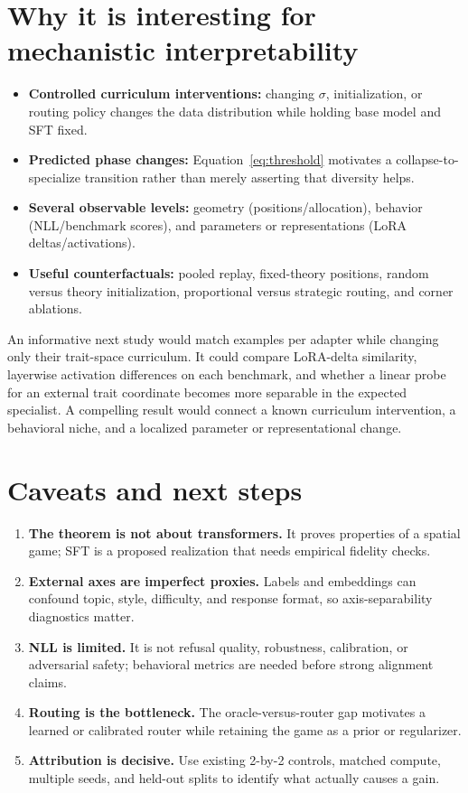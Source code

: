\documentclass[11pt]{article}
\begin{document}
\section{Why it is interesting for mechanistic interpretability}
\begin{itemize}
\item \textbf{Controlled curriculum interventions:} changing $\sigma$, initialization,
or routing policy changes the data distribution while holding base model and SFT fixed.
\item \textbf{Predicted phase changes:} Equation~\ref{eq:threshold} motivates a
collapse-to-specialize transition rather than merely asserting that diversity helps.
\item \textbf{Several observable levels:} geometry (positions/allocation), behavior
(NLL/benchmark scores), and parameters or representations (LoRA deltas/activations).
\item \textbf{Useful counterfactuals:} pooled replay, fixed-theory positions, random
versus theory initialization, proportional versus strategic routing, and corner ablations.
\end{itemize}
An informative next study would match examples per adapter while changing only their
trait-space curriculum. It could compare LoRA-delta similarity, layerwise activation
differences on each benchmark, and whether a linear probe for an external trait
coordinate becomes more separable in the expected specialist. A compelling result would
connect a known curriculum intervention, a behavioral niche, and a localized parameter
or representational change.

\section{Caveats and next steps}
\begin{enumerate}
\item \textbf{The theorem is not about transformers.} It proves properties of a spatial
game; SFT is a proposed realization that needs empirical fidelity checks.
\item \textbf{External axes are imperfect proxies.} Labels and embeddings can confound
topic, style, difficulty, and response format, so axis-separability diagnostics matter.
\item \textbf{NLL is limited.} It is not refusal quality, robustness, calibration, or
adversarial safety; behavioral metrics are needed before strong alignment claims.
\item \textbf{Routing is the bottleneck.} The oracle-versus-router gap motivates a
learned or calibrated router while retaining the game as a prior or regularizer.
\item \textbf{Attribution is decisive.} Use existing 2-by-2 controls, matched compute,
multiple seeds, and held-out splits to identify what actually causes a gain.
\end{enumerate}
\end{document}
